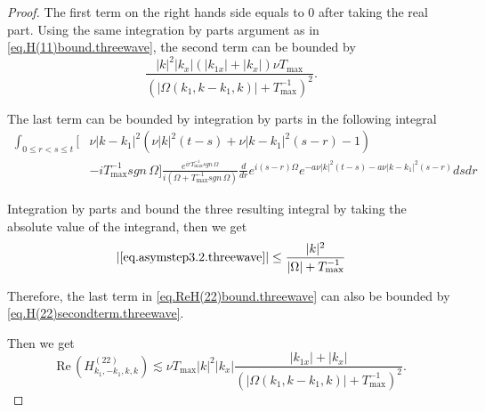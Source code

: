 \begin{proof}
The first term on the right hands side equals to $0$ after taking the real part. Using the same integration by parts argument as in \eqref{eq.H(11)bound.threewave}, the second term can be bounded by 
\begin{equation}\label{eq.H(22)secondterm.threewave}
    \frac{|k|^2|k_x|(|k_{1x}|+|k_x|)\nu T_{\text{max}}}{(|\Omega(k_1,k-k_1,k)|+T^{-1}_{\text{max}})^2}.
\end{equation}

The last term can be bounded by integration by parts in the following integral
\begin{equation}\label{eq.asymstep3.2.threewave}
\begin{split}
    \int_{0\le r<s\le t}\big[&\nu|k-k_1|^2(\nu|k|^2(t-s)+\nu|k-k_1|^2(s-r)-1)
    \\
    & -iT^{-1}_{\text{max}}sgn\, \Omega\big]\frac{e^{irT^{-1}_{\text{max}}sgn\, \Omega}}{i(\Omega+T^{-1}_{\text{max}}sgn\, \Omega)}\frac{d}{dr}e^{i (s-r)\Omega}e^{- a\nu|k|^2(t-s)-a\nu|k-k_1|^2(s-r)}  dsdr
\end{split}
\end{equation}

Integration by parts and bound the three resulting integral by taking the absolute value of the integrand, then we get 
\begin{equation}
|\eqref{eq.asymstep3.2.threewave}|\le  \frac{|k|^2}{|\Omega|+T^{-1}_{\text{max}}}
\end{equation}

Therefore, the last term in \eqref{eq.ReH(22)bound.threewave} can also be bounded by \eqref{eq.H(22)secondterm.threewave}.

Then we get 
\begin{equation}
    \text{Re}\,\left(H^{(22)}_{k_1,-k_1,k,k}\right)\lesssim \nu T_{\text{max}}|k|^2|k_x|\frac{|k_{1x}|+|k_x|}{(|\Omega(k_1,k-k_1,k)|+T^{-1}_{\text{max}})^2}.
\end{equation}


\end{proof}
